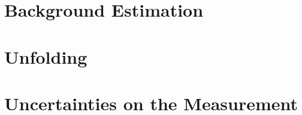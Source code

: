 \label{sec:Analysis Strategy}

\section{Background Estimation}
\label{sec:Bkg}


\section{Unfolding}
\label{sec:Unfolding}


\section{Uncertainties on the Measurement}
\label{sec:Uncertainties}



